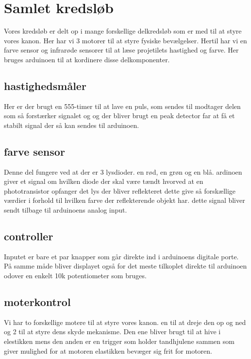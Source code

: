 \section{Samlet kredsløb}
Vores kredsløb er delt op i mange forskellige delkredsløb som er med til at styre vores kanon. Her har vi 3 motorer til at styre fysiske bevælgelser. Hertil har vi en farve sensor og infrarøde sensorer til at læse projetilets hastighed og farve. Her bruges arduinoen til at kordinere disse delkomponenter.


\subsection{hastighedsmåler}
Her er der brugt en 555-timer til at lave en puls, som sendes til modtager delen som så forstærker signalet og og der bliver brugt en peak detector far at få et stabilt signal der så kan sendes til arduinoen.
 \subsection{farve sensor}
Denne del fungere ved at der er 3 lysdioder. en rød, en grøn og en blå. ardinoen giver et signal om hvilken diode der skal være tændt hvorved at en phototransistor opfanger det lys der bliver reflekteret dette give så forskællige værdier i forhold til hvilken farve der reflekterende objekt har. dette signal bliver sendt tilbage til arduinoens analog input.
\subsection{controller}
Inputet er bare et par knapper som går direkte ind i arduinoens digitale porte.
På samme måde bliver displayet også for det meste tilkoplet direkte til arduinoen odover en enkelt 10k potentiometer som bruges.
\subsection{moterkontrol}

Vi har to forskellige motere til at styre vores kanon. en til at dreje den op og ned og 2 til at styre dens skyde mekanisme. Den ene bliver brugt til at hive i elestikken mens den anden er en trigger som holder tandhjulene sammen som giver mulighed for at motoren elastikken bevæger sig frit for motoren.
